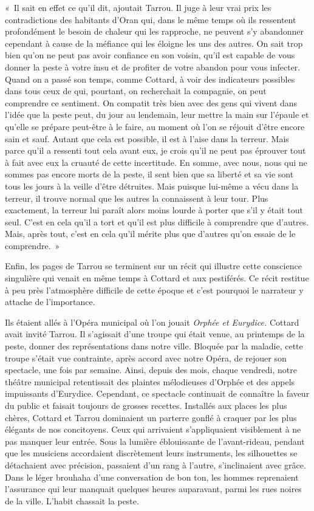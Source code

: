 \documentclass[french,twoside]{book} %
\begin{document}
« Il sait en effet ce qu’il dit, ajoutait Tarrou. Il juge à leur vrai prix les contradictions des habitants d’Oran qui, dans le même temps où ils ressentent profondément le besoin de chaleur qui les rapproche, ne peuvent s’y abandonner cependant à cause de la méfiance qui les éloigne les uns des autres. On sait trop bien qu’on ne peut pas avoir confiance en son voisin, qu’il est capable de vous donner la peste à votre insu et de profiter de votre abandon pour vous infecter. Quand on a passé son temps, comme Cottard, à voir des indicateurs possibles dans tous ceux de qui, pourtant, on recherchait la compagnie, on peut comprendre ce sentiment. On compatit très bien avec des gens qui vivent dans l’idée que la peste peut, du jour au lendemain, leur mettre la main sur l’épaule et qu’elle se prépare peut-être à le faire, au moment où l’on se réjouit d’être encore sain et sauf. Autant que cela est possible, il est à l’aise dans la terreur. Mais parce qu’il a ressenti tout cela avant eux, je crois qu’il ne peut pas éprouver tout à fait avec eux la cruauté de cette incertitude. En somme, avec nous, nous qui ne sommes pas encore morts de la peste, il sent bien que sa liberté et sa vie sont tous les jours à la veille d’être détruites. Mais puisque lui-même a vécu dans la terreur, il trouve normal que les autres la connaissent à leur tour. Plus exactement, la terreur lui paraît alors moins lourde à porter que s’il y était tout seul. C’est en cela qu’il a tort et qu’il est plus difficile à comprendre que d’autres. Mais, après tout, c’est en cela qu’il mérite plus que d’autres qu’on essaie de le comprendre. »\par
Enfin, les pages de Tarrou se terminent sur un récit qui illustre cette conscience singulière qui venait en même temps à Cottard et aux pestiférés. Ce récit restitue à peu près l’atmosphère difficile de cette époque et c’est pourquoi le narrateur y attache de l’importance.\par
Ils étaient allés à l’Opéra municipal où l’on jouait \emph{Orphée et Eurydice.} Cottard avait invité Tarrou. Il s’agissait d’une troupe qui était venue, au printemps de la peste, donner des représentations dans notre ville. Bloquée par la maladie, cette troupe s’était vue contrainte, après accord avec notre Opéra, de rejouer son spectacle, une fois par semaine. Ainsi, depuis des mois, chaque vendredi, notre théâtre municipal retentissait des plaintes mélodieuses d’Orphée et des appels impuissants d’Eurydice. Cependant, ce spectacle continuait de connaître la faveur du public et faisait toujours de grosses recettes. Installés aux places les plus chères, Cottard et Tarrou dominaient un parterre gonflé à craquer par les plus élégants de nos concitoyens. Ceux qui arrivaient s’appliquaient visiblement à ne pas manquer leur entrée. Sous la lumière éblouissante de l’avant-rideau, pendant que les musiciens accordaient discrètement leurs instruments, les silhouettes se détachaient avec précision, passaient d’un rang à l’autre, s’inclinaient avec grâce. Dans le léger brouhaha d’une conversation de bon ton, les hommes reprenaient l’assurance qui leur manquait quelques heures auparavant, parmi les rues noires de la ville. L’habit chassait la peste.\par
\end{document}
